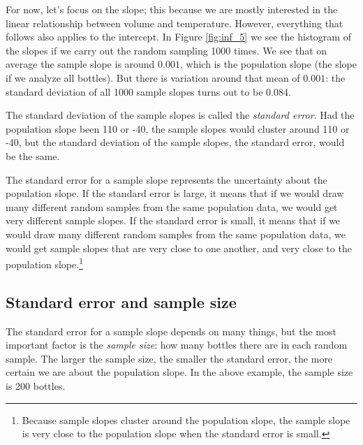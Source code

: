 \documentclass[]{book}\usepackage[]{graphicx}\usepackage[]{color}
\begin{document}
For now, let's focus on the slope; this because we are mostly interested in the linear relationship between volume and temperature. However, everything that follows also applies to the intercept. In Figure \ref{fig:inf_5} we see the histogram of the slopes if we carry out the random sampling 1000 times. We see that on average the sample slope is around $0.001$, which is the population slope (the slope if we analyze all bottles). But there is variation around that mean of $0.001$: the standard deviation of all 1000 sample slopes turns out to be 0.084.


The standard deviation of the sample slopes is called the \textit{standard error}. Had the population slope been 110 or -40, the sample slopes would cluster around 110 or -40, but the standard deviation of the sample slopes, the standard error, would be the same.

The standard error for a sample slope represents the uncertainty about the population slope. If the standard error is large, it means that if we would draw many different random samples from the same population data, we would get very different sample slopes. If the standard error is small, it means that if we would draw many different random samples from the same population data, we would get sample slopes that are very close to one another, and very close to the population slope.\footnote{Because sample slopes cluster around the population slope, the sample slope is very close to the population slope when the standard error is small.}


\subsection{Standard error and sample size}\label{sec:sampsizese}

The standard error for a sample slope depends on many things, but the most important factor is the \textit{sample size}: how many bottles there are in each random sample. The larger the sample size, the smaller the standard error, the more certain we are about the population slope. In the above example, the sample size is 200 bottles.

\end{document}
